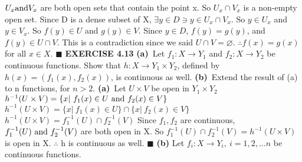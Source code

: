 \documentclass[12pt]{article}
\begin{document}
  \newline \newline
  \(U_x \textup{and} V_x\) are both open sets that contain the point x.
  \newline
  So \(U_x \cap V_x\) is a non-empty open set.
  \newline
  Since D is a dense subset of X, \(\exists y \in D \ni y \in U_x \cap V_x\).
  \newline
  So \(y \in U_x\) and \(y \in V_x\).
  \newline
  So \(f(y) \in U\) and \(g(y) \in V\).
  \newline
  Since \(y \in D\), \(f(y) = g(y)\), and \(f(y) \in U \cap V\).
  \newline \newline
  This is a contradiction since we said \(U \cap V = \varnothing\).
  \newline
  \(\therefore f(x) = g(x)\) for all \(x \in X\).
  \newline \(\blacksquare\)
  \newpage
  \noindent
  \textbf{EXERCISE 4.13}
  \newline
  \textbf{(a)}\ Let \(f_1:X\rightarrow Y_1\) and \(f_2:X\rightarrow Y_2\) be continuous functions. Show that \(h: X \rightarrow Y_1 \times Y_2\), defined by \(h(x)=(f_1(x), f_2(x))\), is continuous as well.
  \newline
  \textbf{(b)}\ Extend the result of (a) to n functions, for \(n > 2\).
  \newline \newline
  \textbf{(a)}\ Let \(U \times V\) be open in \(Y_1 \times Y_2\)
  \newline
  \(h^{-1}(U \times V) = \{x|\ f_1(x) \in U \textup{ and } f_2(x) \in V\}\)
  \newline
  \(h^{-1}(U \times V) = \{x|\ f_1(x) \in U\} \cap \{x|\ f_2(x) \in V\}\)
  \newline
  \(h^{-1}(U \times V) = f_1^{-1}(U) \cap f_2^{-1}(V)\)
  \newline \newline
  Since \(f_1, f_2\) are continuous, \(f_1^{-1}(U) \textup{ and } f_2^{-1}(V)\) are both open in X.
  \newline
  So \(f_1^{-1}(U) \cap f_2^{-1}(V) = h^{-1}(U \times V)\) is open in X.
  \newline
  \(\therefore\) h is continuous as well.
  \newline \(\blacksquare\) \newline
  \textbf{(b)}
  \newline
  Let \(f_i: X \rightarrow Y_i,\ i = 1,2,...n\) be continuous functions.
\end{document}
